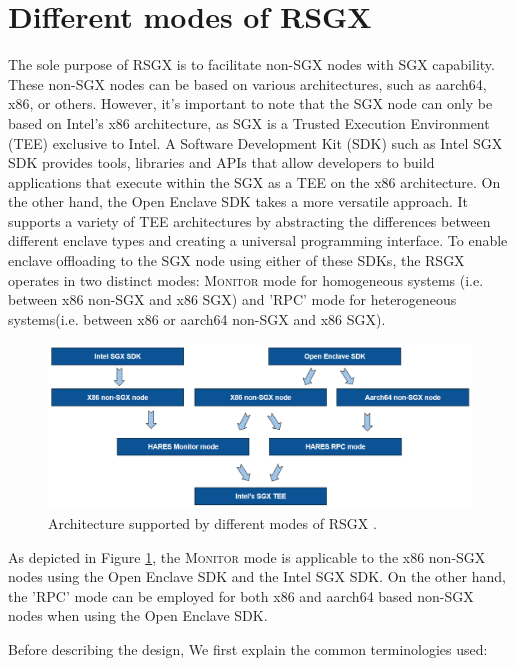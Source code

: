 \documentclass[article, doublespace,nopageskip]{VTthesis} %
\newcommand{\monitor}{RSGX \xspace}
\begin{document}
    \section{Different modes of \monitor} \label{ase:monitor design}
    The sole purpose of \monitor is to facilitate non-SGX nodes with SGX capability. These non-SGX nodes can be based on various architectures, such as aarch64, x86, or others.  However, it's important to note that the SGX node can only be based on Intel's x86 architecture, as SGX is a Trusted Execution Environment (TEE) exclusive to Intel. A Software Development Kit (SDK) such as Intel SGX SDK \cite{Intel-SGX} provides tools, libraries and APIs that allow developers to build applications that execute within the SGX as a TEE on the x86 architecture. On the other hand, the Open Enclave SDK \cite{Open-Enclave} takes a more versatile approach. It supports a variety of TEE architectures by abstracting the differences between different enclave types and creating a universal programming interface. To enable enclave offloading to the SGX node using either of these SDKs, the \monitor operates in two distinct modes: \textsc{Monitor} mode for homogeneous systems (i.e. between x86 non-SGX and x86 SGX) and 'RPC' mode for heterogeneous systems(i.e. between x86 or aarch64 non-SGX and x86 SGX). 

    \begin{figure}[htb]
	    \centering
		\includegraphics[scale=1.3]{figures/Arch_support_sgx2.png}
		\caption{Architecture supported by different modes of \monitor.} 
		\label{fig:arch_supported}
	\end{figure}

    As depicted in Figure \ref{fig:arch_supported}, the \textsc{Monitor} mode is applicable to the  x86 non-SGX nodes using the Open Enclave SDK and the Intel SGX SDK. On the other hand, the 'RPC' mode can be employed for both x86 and aarch64 based non-SGX nodes when using the Open Enclave SDK. 

    Before describing the design, We first explain the common terminologies used:
\end{document}
